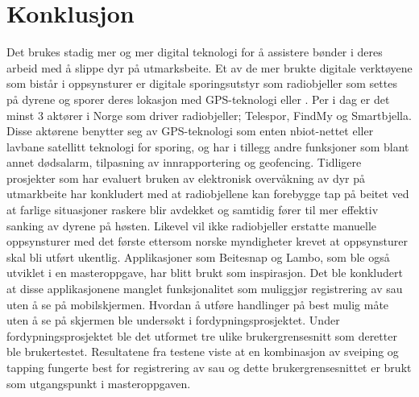 \section{Konklusjon}
Det brukes stadig mer og mer digital teknologi for å assistere bønder i deres arbeid med å slippe dyr på utmarksbeite. Et av de mer brukte digitale verktøyene som bistår i oppsynsturer er digitale sporingsutstyr som radiobjeller som settes på dyrene og sporer deres lokasjon med GPS-teknologi eller \cite{nbiot}. Per i dag er det minst 3 aktører i Norge som driver radiobjeller; Telespor, FindMy og Smartbjella. Disse aktørene benytter seg av GPS-teknologi som enten \acrshort{nbiot}-nettet eller lavbane satellitt teknologi for sporing, og har i tillegg andre funksjoner som blant annet dødsalarm, tilpasning av innrapportering og geofencing. Tidligere prosjekter som har evaluert bruken av elektronisk overvåkning av dyr på utmarkbeite har konkludert med at radiobjellene kan forebygge tap på beitet ved at farlige situasjoner raskere blir avdekket og samtidig fører til mer effektiv sanking av dyrene på høsten. Likevel vil ikke radiobjeller erstatte manuelle oppsynsturer med det første ettersom norske myndigheter krevet at oppsynsturer skal bli utført ukentlig. Applikasjoner som Beitesnap og Lambo, som ble også utviklet i en masteroppgave, har blitt brukt som inspirasjon. Det ble konkludert at disse applikasjonene manglet funksjonalitet som muliggjør registrering av sau uten å se på mobilskjermen. Hvordan å utføre handlinger på best mulig måte uten å se på skjermen ble undersøkt i fordypningsprosjektet. Under fordypningsprosjektet ble det utformet tre ulike brukergrensesnitt som deretter ble brukertestet. Resultatene fra testene viste at en kombinasjon av sveiping og tapping fungerte best for registrering av sau og dette brukergrensesnittet er brukt som utgangspunkt i masteroppgaven. 